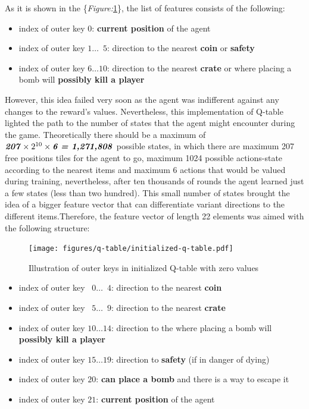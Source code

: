 \documentclass{article}
\begin{document}
As it is shown in the \{\textit{Figure:}\ref{fig:initialized-q-table}\}, the list of features consists of the following:

\begin{itemize}
    \item index of outer key $0$: \textbf{current position} of the agent
    \item index of outer key $1 \ldots \phantom{0}5$: direction to the nearest \textbf{coin} or \textbf{safety} 
    \item index of outer key $6 \ldots 10$: direction to the nearest \textbf{crate} or where placing a bomb will \textbf{possibly kill a player}
\end{itemize}




However, this idea failed very soon as the agent was indifferent against any changes to the reward's values. Nevertheless, this implementation of Q-table lighted the path to the number of states that the agent might encounter during the game. Theoretically there should be a maximum of $\textbf{\textit{207}} \times {2^{10}} \times \textbf{\textit{6 = 1,271,808}}$ possible states, in which there are maximum 207 free positions tiles for the agent to go, maximum 1024 possible actions-state according to the nearest items and maximum 6 actions that would be valued during training, nevertheless, after ten thousands of rounds the agent learned just a few states (less than two hundred). This small number of states brought the idea of a bigger feature vector that can differentiate variant directions to the different items.Therefore, the feature vector of length 22 elements was aimed with the following structure:


\begin{figure}[h]
    \centering
    \texttt{[image: figures/q-table/initialized-q-table.pdf]}
    \caption{Illustration of outer keys in initialized Q-table with zero values }
    \label{fig:initialized-q-table}
\end{figure}


\begin{itemize}
    \item index of outer key $\phantom{0}0 \ldots \phantom{0}4$: direction to the nearest \textbf{coin}
    \item index of outer key $\phantom{0}5 \ldots \phantom{0}9$: direction to the nearest \textbf{crate} 
    \item index of outer key $10 \ldots 14$: direction to the where placing a bomb will \textbf{possibly kill a player}
    \item index of outer key $15 \ldots 19$: direction to \textbf{safety} (if in danger of dying)
    \item index of outer key $20$: \textbf{can place a bomb} and there is a way to escape it
    \item index of outer key $21$: \textbf{current position} of the agent
\end{itemize}
\end{document}
